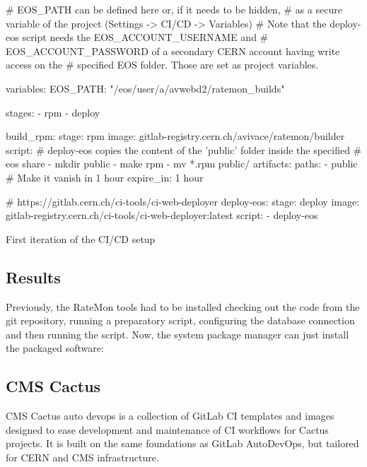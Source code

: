 \begin{listing}[ht]
\begin{yamlcode}

# EOS_PATH can be defined here or, if it needs to be hidden, 
# as a secure variable of the project (Settings -> CI/CD -> Variables)
# Note that the deploy-eos script needs the EOS_ACCOUNT_USERNAME and 
# EOS_ACCOUNT_PASSWORD of a secondary CERN account having write access on the
# specified EOS folder. Those are set as project variables.

variables:
  EOS_PATH: "/eos/user/a/avwebd2/ratemon_builds"

stages:
  - rpm
  - deploy

build_rpm:
  stage: rpm
  image: gitlab-registry.cern.ch/avivace/ratemon/builder
  script:
    # deploy-eos copies the content of the 'public' folder inside the specified
    # eos share
    - mkdir public
    - make rpm
    - mv *.rpm public/
  artifacts:
    paths:
      - public
    # Make it vanish in 1 hour
    expire_in: 1 hour

# https://gitlab.cern.ch/ci-tools/ci-web-deployer
deploy-eos:
  stage: deploy
  image: gitlab-registry.cern.ch/ci-tools/ci-web-deployer:latest
  script:
    - deploy-eos

\end{yamlcode}
\caption{First iteration of the CI/CD setup}
\end{listing}

\subsection{Results}

Previously, the RateMon tools had to be installed checking out the code from the git repository, running a preparatory script, configuring the database connection and then running the script. Now, the system package manager can just install the packaged software:


\subsection{CMS Cactus}

CMS Cactus auto devops \cite{DirkxCactus} is a collection of GitLab CI templates and images designed to ease development and maintenance of CI workflows for Cactus projects. It is built on the same foundations as GitLab AutoDevOps, but tailored for CERN and CMS infrastructure.

